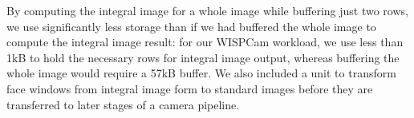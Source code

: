 By computing the integral image for a whole image while buffering just two rows, we use significantly less storage than if we had buffered the whole image to compute the integral image result: for our WISPCam workload, we use less than 1kB to hold the necessary rows for integral image output, whereas buffering the whole image would require a 57kB buffer.
We also included a unit to transform face windows from integral image form to standard images before they are transferred to later stages of a camera pipeline.







